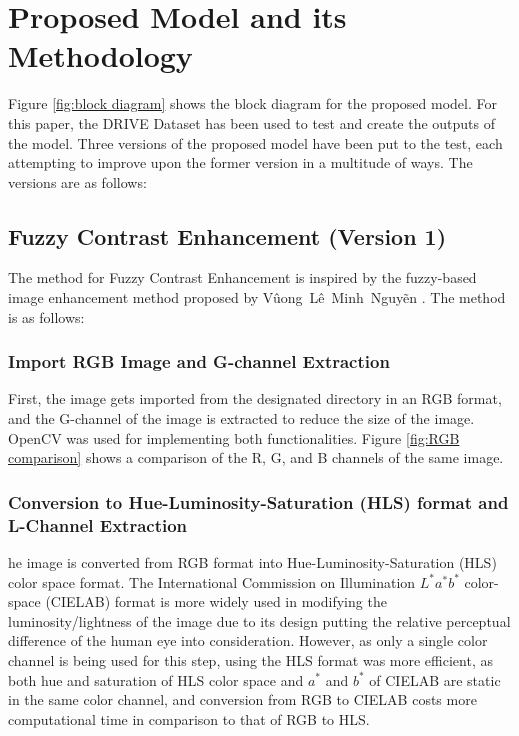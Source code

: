 \section{Proposed Model and its Methodology}
\label{sec:methodologies}



Figure \ref{fig:block diagram} shows the block diagram for the proposed model.  For this paper, the DRIVE Dataset has been used to test and create the outputs of the model. Three versions of the proposed model have been put to the test, each attempting to improve upon the former version in a multitude of ways. The versions are as follows:

\subsection{Fuzzy Contrast Enhancement (Version 1)}
\label{subsec:version_1}
The method for Fuzzy Contrast Enhancement is inspired by the fuzzy-based image enhancement method proposed by V\^{u}ong\ L\^e\ Minh\ Nguy\~en
\cite{FuzzyLogicImage}. The method is as follows:

\subsubsection{Import RGB Image and G-channel Extraction}
First, the image gets imported from the designated directory in an RGB format, and the G-channel of the image is extracted to reduce the size of the image.  OpenCV was used for implementing both functionalities.  Figure \ref{fig:RGB comparison} shows a comparison of the R, G, and B channels of the same image.



\subsubsection{Conversion to Hue-Luminosity-Saturation (HLS) format and L-Channel Extraction}
he image is converted from RGB format into Hue-Luminosity-Saturation (HLS) color space format. The International Commission on Illumination $L^{*}a^{*}b^{*}$ color-space (CIELAB) format is more widely used in modifying the luminosity/lightness of the image due to its design putting the relative perceptual difference of the human eye into consideration. However, as only a single color channel is being used for this step, using the HLS format was more efficient, as both hue and saturation of HLS color space and $a^{*}$ and $b^{*}$ of CIELAB are static in the same color channel, and conversion from RGB to CIELAB costs more computational time in comparison to that of RGB to HLS.


